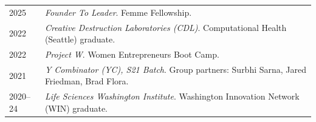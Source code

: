 \documentclass[11pt]{article}
\begin{document}



  

{}

\begin{tabular}{V}
  2025 & \textit{Founder To Leader}. Femme Fellowship. \\
  2022 & \textit{Creative Destruction Laboratories (CDL)}. Computational Health (Seattle) graduate. \\
  2022 & \textit{Project W}. Women Entrepreneurs Boot Camp. \\
  2021 & \textit{Y Combinator (YC), S21 Batch}. Group partners: Surbhi Sarna, Jared Friedman, Brad Flora. \\
  2020--24 & \textit{Life Sciences Washington Institute}. Washington Innovation Network (WIN) graduate.\\
\end{tabular}
\end{document}
